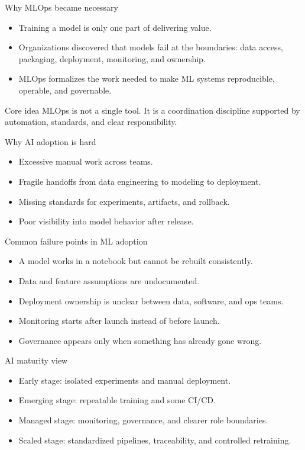 \begin{frame}{Why MLOps became necessary}
\begin{itemize}
\item Training a model is only one part of delivering value.
\item Organizations discovered that models fail at the boundaries: data access, packaging, deployment, monitoring, and ownership.
\item MLOps formalizes the work needed to make ML systems reproducible, operable, and governable.
\end{itemize}
\begin{block}{Core idea}
MLOps is not a single tool. It is a coordination discipline supported by automation, standards, and clear responsibility.
\end{block}
\coursefooter
\end{frame}

\begin{frame}{Why AI adoption is hard}
\begin{itemize}
\item Excessive manual work across teams.
\item Fragile handoffs from data engineering to modeling to deployment.
\item Missing standards for experiments, artifacts, and rollback.
\item Poor visibility into model behavior after release.
\end{itemize}
\coursefooter
\end{frame}

\begin{frame}{Common failure points in ML adoption}
\begin{itemize}
\item A model works in a notebook but cannot be rebuilt consistently.
\item Data and feature assumptions are undocumented.
\item Deployment ownership is unclear between data, software, and ops teams.
\item Monitoring starts after launch instead of before launch.
\item Governance appears only when something has already gone wrong.
\end{itemize}
\coursefooter
\end{frame}

\begin{frame}{AI maturity view}
\begin{itemize}
\item Early stage: isolated experiments and manual deployment.
\item Emerging stage: repeatable training and some CI/CD.
\item Managed stage: monitoring, governance, and clearer role boundaries.
\item Scaled stage: standardized pipelines, traceability, and controlled retraining.
\end{itemize}
\coursefooter
\end{frame}

